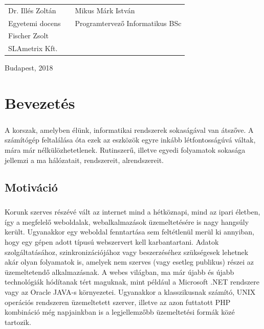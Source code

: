 \documentclass[12pt]{report}
\begin{document}
\begin{titlepage}
      \vspace*{5cm}

      \begin{tabular}{lp{6cm}l}
          Dr. Illés Zoltán  & &  Mikus Márk István \\
          Egyetemi docens & & Programtervező Informatikus BSc \\
          Fischer Zsolt & \\
          SLAmetrix Kft. &
      \end{tabular}		

      \vfill

      \vspace*{1cm}
      Budapest, 2018
  \end{titlepage}
	\tableofcontents

\chapter{Bevezetés}
\paragraph{}
A korszak, amelyben élünk, informatikai rendszerek sokaságával van átszőve. A számítógép feltalálása óta ezek az eszközök egyre inkább létfontosságúvá váltak, mára már nélkülözhetetlenek. Rutinszerű, illetve egyedi folyamatok sokasága jellemzi a ma hálózatait, rendszereit, alrendszereit.

\section{Motiváció}
\paragraph{}
Korunk szerves részévé vált az internet mind a hétköznapi, mind az ipari életben, így a megfelelő weboldalak, webalkalmazások üzemeltetésére is nagy hangsúly került. Ugyanakkor egy weboldal fenntartása sem feltétlenül merül ki annyiban, hogy egy gépen adott típusú webszervert kell karbantartani. Adatok szolgáltatásához, szinkronizációjához vagy beszerzéséhez szükségesek lehetnek akár olyan folyamatok is, amelyek nem szerves (vagy esetleg publikus) részei az üzemeltetendő alkalmazásnak.
A webes világban, ma már újabb és újabb technológiák hódítanak tért maguknak, mint például a Microsoft .NET rendszere vagy az Oracle JAVA-s környezetei. Ugyanakkor a klasszikusnak számító, UNIX operációs rendszeren üzemeltetett szerver, illetve az azon futtatott PHP kombináció még napjainkban is a legjellemzőbb üzemeltetési formák közé tartozik.
\end{document}
